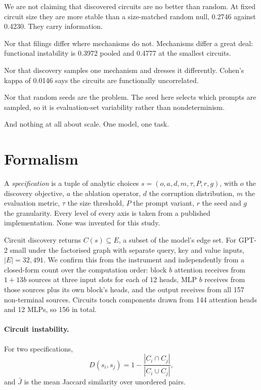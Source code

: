 \documentclass[11pt]{article}
\begin{document}
We are not claiming that discovered circuits are no better than random. At fixed
circuit size they are more stable than a size-matched random null, 0.2746 against
0.4230. They carry information.

Nor that filings differ where mechanisms do not. Mechanisms differ a great deal:
functional instability is 0.3972 pooled and 0.4777 at the smallest circuits.

Nor that discovery samples one mechanism and dresses it differently. Cohen's kappa
of 0.0146 says the circuits are functionally uncorrelated.

Nor that random seeds are the problem. The seed here selects which prompts are
sampled, so it is evaluation-set variability rather than nondeterminism.

And nothing at all about scale. One model, one task.

\section{Formalism}

A \emph{specification} is a tuple of analytic choices
$s = (o, a, d, m, \tau, P, r, g)$, with $o$ the discovery objective, $a$ the
ablation operator, $d$ the corruption distribution, $m$ the evaluation metric,
$\tau$ the size threshold, $P$ the prompt variant, $r$ the seed and $g$ the
granularity. Every level of every axis is taken from a published implementation.
None was invented for this study.

Circuit discovery returns $C(s) \subseteq E$, a subset of the model's edge set.
For GPT-2 small under the factorised graph with separate query, key and value
inputs, $|E| = 32{,}491$. We confirm this from the instrument and independently
from a closed-form count over the computation order: block $b$ attention receives
from $1 + 13b$ sources at three input slots for each of 12 heads, MLP $b$ receives
from those sources plus its own block's heads, and the output receives from all
157 non-terminal sources. Circuits touch components drawn from 144 attention heads
and 12 MLPs, so 156 in total.

\paragraph{Circuit instability.} For two specifications,
\begin{equation}
D(s_i, s_j) = 1 - \frac{|C_i \cap C_j|}{|C_i \cup C_j|},
\end{equation}
and $\bar{J}$ is the mean Jaccard similarity over unordered pairs.
\end{document}
